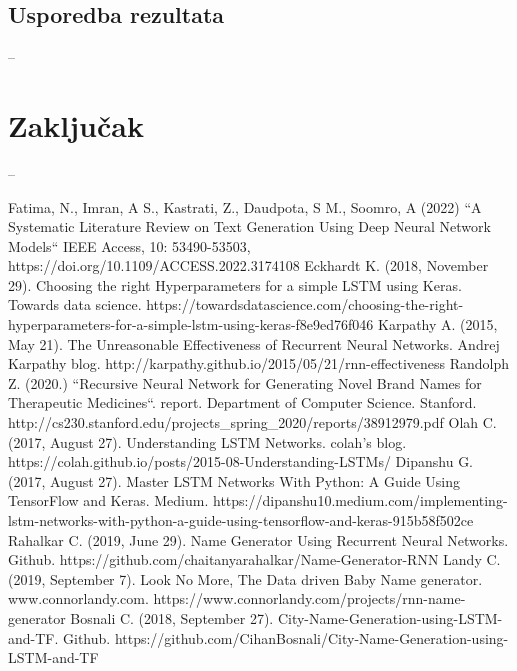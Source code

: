 \documentclass[conference]{IEEEtran}
\begin{document}
\subsection{Usporedba rezultata}
--

\section{Zaključak}
--


\begin{thebibliography}{00}
 Fatima, N., Imran, A S., Kastrati, Z., Daudpota, S M., Soomro, A (2022) ``A Systematic Literature Review on Text Generation Using Deep Neural Network Models``
IEEE Access, 10: 53490-53503, https://doi.org/10.1109/ACCESS.2022.3174108
 Eckhardt K. (2018, November 29). Choosing the right Hyperparameters for a simple LSTM using Keras. Towards data science. https://towardsdatascience.com/choosing-the-right-hyperparameters-for-a-simple-lstm-using-keras-f8e9ed76f046
 Karpathy A. (2015, May 21). The Unreasonable Effectiveness of Recurrent Neural Networks. Andrej Karpathy blog. http://karpathy.github.io/2015/05/21/rnn-effectiveness
 Randolph Z. (2020.) ``Recursive Neural Network for Generating Novel
Brand Names for Therapeutic Medicines``. report. Department of Computer Science. Stanford. http://cs230.stanford.edu/projects\_spring\_2020/reports/38912979.pdf
 Olah C. (2017, August 27). Understanding LSTM Networks. colah's blog. https://colah.github.io/posts/2015-08-Understanding-LSTMs/
 Dipanshu G. (2017, August 27). Master LSTM Networks With Python: A Guide Using TensorFlow and Keras. Medium. https://dipanshu10.medium.com/implementing-lstm-networks-with-python-a-guide-using-tensorflow-and-keras-915b58f502ce
 Rahalkar C. (2019, June 29). Name Generator Using Recurrent Neural Networks. Github. https://github.com/chaitanyarahalkar/Name-Generator-RNN
 Landy C. (2019, September 7). Look No More, The Data driven Baby Name generator. www.connorlandy.com. https://www.connorlandy.com/projects/rnn-name-generator
 Bosnali C. (2018, September 27). City-Name-Generation-using-LSTM-and-TF. Github. https://github.com/CihanBosnali/City-Name-Generation-using-LSTM-and-TF
\end{thebibliography}
\newpage
\
\end{document}
